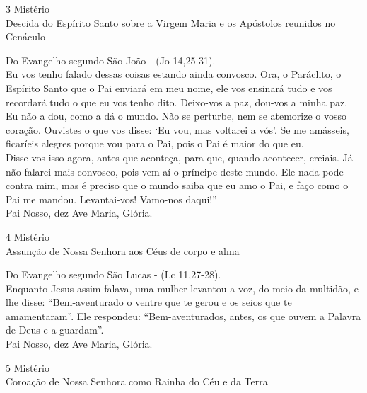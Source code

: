 \documentclass{book}
\begin{document}
\newpage
\begin{center}
    3\textordmasculine{} Mistério \\ Descida do Espírito Santo sobre a Virgem Maria e os Apóstolos reunidos no Cenáculo
\end{center}
\begin{flushleft}
    Do Evangelho segundo São João - (\textcolor{VioletRed2}{Jo 14,25-31}). \\
    \hfill{} \break{}
    Eu vos tenho falado dessas coisas estando ainda convosco. Ora, o Paráclito, o Espírito Santo que o Pai enviará em meu nome, ele vos ensinará tudo e vos recordará tudo o que eu vos tenho dito. Deixo-vos a paz, dou-vos a minha paz. Eu não a dou, como a dá o mundo. Não se perturbe, nem se atemorize o vosso coração. Ouvistes o que vos disse: `Eu vou, mas voltarei a vós'. Se me amásseis, ficaríeis alegres porque vou para o Pai, pois o Pai é maior do que eu.
    \vspace{.2cm} \\
    Disse-vos isso agora, antes que aconteça, para que, quando acontecer, creiais. Já não falarei mais convosco, pois vem aí o príncipe deste mundo. Ele nada pode contra mim, mas é preciso que o mundo saiba que eu amo o Pai, e faço como o Pai me mandou. Levantai-vos! Vamo-nos daqui!'' \\
    \hfill{} \break{}
    Pai Nosso, dez Ave Maria, Glória.
\end{flushleft}
\begin{center}
    4\textordmasculine{} Mistério \\ Assunção de Nossa Senhora aos Céus de corpo e alma
\end{center}
\begin{flushleft}
    Do Evangelho segundo São Lucas - (\textcolor{VioletRed2}{Lc 11,27-28}). \\
    \hfill{} \break{}
    Enquanto Jesus assim falava, uma mulher levantou a voz, do meio da multidão, e lhe disse: ``Bem-aventurado o ventre que te gerou e os seios que te amamentaram''. Ele respondeu: ``Bem-aventurados, antes, os que ouvem a Palavra de Deus e a guardam''. \\
    \hfill{} \break{}
    Pai Nosso, dez Ave Maria, Glória.
\end{flushleft}
\newpage
\begin{center}
    5\textordmasculine{} Mistério \\ Coroação de Nossa Senhora como Rainha do Céu e da Terra
\end{center}
\end{document}
